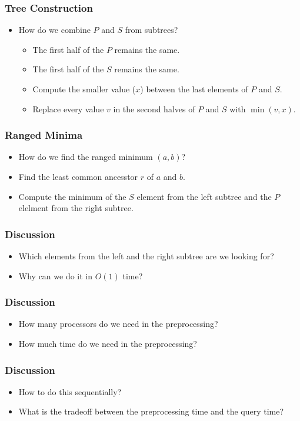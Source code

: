 \documentclass{beamer}
\begin{document}
\begin{CJK}{UTF8}{bsmi}
\begin{frame}
\frametitle{Tree Construction}
\begin{itemize}
\item How do we combine $P$ and $S$ from subtrees?
  \begin{itemize}
  \item The first half of the $P$ remains the same.
  \item The first half of the $S$ remains the same.
  \item Compute the smaller value ($x$) between the last elements of $P$ and $S$.
  \item Replace every value $v$ in the second halves of $P$ and $S$ with $\min(v, x)$.
  \end{itemize}
\end{itemize}
\end{frame}

\begin{frame}
\frametitle{Ranged Minima}
\begin{itemize}
\item How do we find the ranged minimum $(a, b)$?
\item Find the least common ancesstor $r$ of $a$ and $b$.
\item Compute the minimum of the $S$ element from the left subtree and the $P$ elelment from the right subtree.
\end{itemize}
\end{frame}

\begin{frame}
\frametitle{Discussion}
\begin{itemize}
\item Which elements from the left and the right subtree are we looking for?
\item Why can we do it in $O(1)$ time?

\end{itemize}
\end{frame}

\begin{frame}
\frametitle{Discussion}
\begin{itemize}
\item How many processors do we need in the preprocessing?
\item How much time do we need in the preprocessing?
\end{itemize}
\end{frame}

\begin{frame}
\frametitle{Discussion}
\begin{itemize}
\item How to do this sequentially?
\item What is the tradeoff between the preprocessing time and the query time?
\end{itemize}
\end{frame}

\end{CJK}
\end{document}
